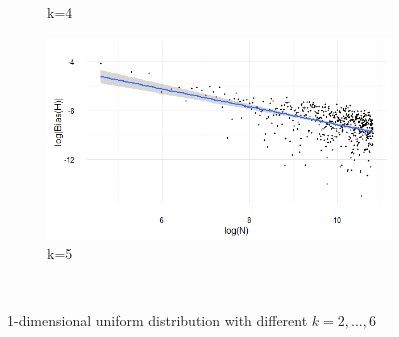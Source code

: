 \documentclass[12pt]{report}
\begin{document}
\begin{figure}
{\begin{subfigure}[b]{.6\textwidth}
\caption{k=4}
\end{subfigure}%
\begin{subfigure}[b]{.6\textwidth}
\centering
\includegraphics[width=\textwidth]{./Graphs/Best/Uniform_k=5.png}
\caption{k=5}
\end{subfigure}%
}\    
\caption{1-dimensional uniform distribution with different $k = 2, ..., 6$} \label{Uniform_graphs26}
\end{figure}
\end{document}
